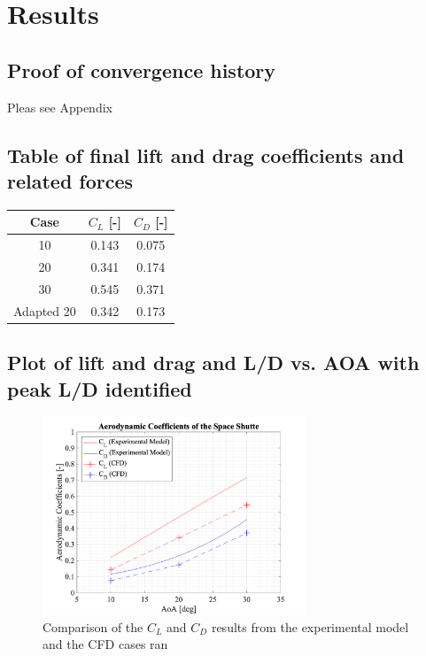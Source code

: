 \section{Results}

\subsection{Proof of convergence history}
Pleas see Appendix
\subsection{Table of final lift and drag coefficients and related forces}
\begin{table}[H]
	\centering
	\begin{tabular}{|c|c|c|} \hline
		\centering
		\textbf{Case}       & $C_L$ [-]   & $C_D$ [-]    \\ \hline
		10         & 0.143 & 0.075 \\ \hline
		20         & 0.341 & 0.174 \\ \hline
		30         & 0.545 & 0.371 \\ \hline
		Adapted 20 & 0.342 & 0.173 \\ \hline
	\end{tabular}
\end{table}

\subsection{Plot of lift and drag and L/D vs. AOA with peak L/D identified}

\begin{figure}[H]
 \centering
 \includegraphics[width=0.7\textwidth]{matlab_images/aero_coeff_comp.png}
 \caption{Comparison of the $C_L$ and $C_D$ results from the experimental model and the CFD cases ran}
 \label{fig: aero_coeff_comp}
\end{figure}

